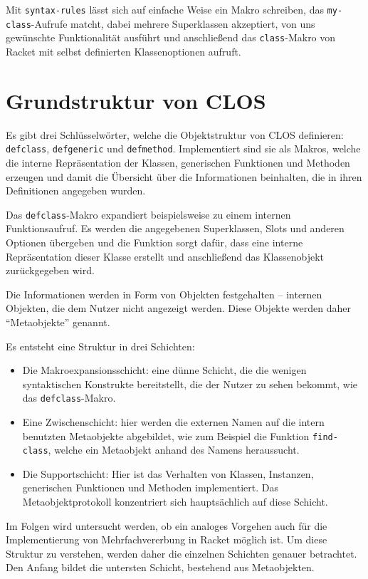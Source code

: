 Mit \texttt{syntax-rules} lässt sich auf einfache Weise ein Makro schreiben, das  \texttt{my-class}-Aufrufe matcht, dabei mehrere Superklassen akzeptiert, von uns gewünschte Funktionalität ausführt und anschließend das \texttt{class}-Makro von Racket mit selbst definierten Klassenoptionen aufruft.


\section{Grundstruktur von CLOS}
Es gibt drei Schlüsselwörter, welche die Objektstruktur von CLOS definieren:  \texttt{defclass}, \texttt{defgeneric} und \texttt{defmethod}. Implementiert sind sie als Makros, welche die interne Repräsentation der Klassen, generischen Funktionen und Methoden erzeugen und damit die Übersicht über die Informationen beinhalten, die in ihren Definitionen angegeben wurden.

Das \texttt{defclass}-Makro expandiert beispielsweise zu einem internen Funktionsaufruf. Es werden die angegebenen Superklassen, Slots und anderen Optionen übergeben und die Funktion sorgt dafür, dass eine interne Repräsentation dieser Klasse erstellt und anschließend das Klassenobjekt zurückgegeben wird.

Die Informationen werden in Form von Objekten festgehalten -- internen Objekten, die dem Nutzer nicht angezeigt werden. Diese Objekte werden daher ``Metaobjekte'' genannt.

Es entsteht eine Struktur in drei Schichten:
\begin{itemize}
 \item Die Makroexpansionsschicht: eine dünne Schicht, die die wenigen syntaktischen Konstrukte bereitstellt, die der Nutzer zu sehen bekommt, wie das \texttt{defclass}-Makro.
 \item Eine Zwischenschicht: hier werden die externen Namen auf die intern benutzten Metaobjekte abgebildet, wie zum Beispiel die Funktion \texttt{find-class}, welche ein Metaobjekt anhand des Namens heraussucht.
 \item Die Supportschicht: Hier ist das Verhalten von Klassen, Instanzen, generischen Funktionen und Methoden implementiert. Das Metaobjektprotokoll konzentriert sich hauptsächlich auf diese Schicht.
\end{itemize}

Im Folgen wird untersucht werden, ob ein analoges Vorgehen auch für die Implementierung von Mehrfachvererbung in Racket möglich ist. Um diese Struktur zu verstehen, werden daher die einzelnen Schichten genauer betrachtet. Den Anfang bildet die untersten Schicht, bestehend aus Metaobjekten.

